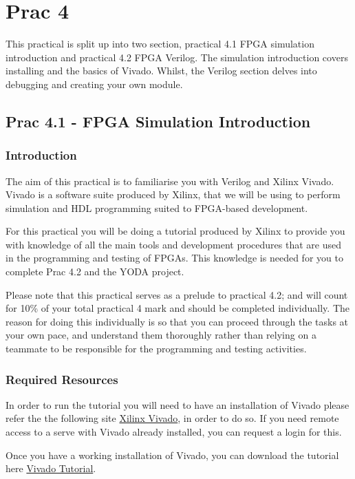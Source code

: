 
\section{Prac 4}
This practical is split up into two section, practical 4.1 FPGA simulation introduction and practical 4.2 FPGA Verilog. The simulation introduction covers installing and the basics of Vivado. Whilst, the Verilog section delves into debugging and creating your own module.
\label{sec:Prac4}

\subsection{Prac 4.1 - FPGA Simulation Introduction}
\subsubsection{Introduction}
The aim of this practical is to familiarise you with Verilog and Xilinx Vivado. Vivado is a software suite produced by Xilinx, that we will be using to perform simulation and HDL programming suited to FPGA-based development.

For this practical you will be doing a tutorial produced by Xilinx to provide you with knowledge of all the main tools and development procedures that are used in the programming and testing of FPGAs. This knowledge is needed for you to complete Prac 4.2 and the YODA project.

Please note that this practical serves as a prelude to practical 4.2; and will count for 10\% of your total practical 4 mark and should be completed individually. The reason for doing this individually is so that you can proceed through the tasks at your own pace, and understand them thoroughly rather than relying on a teammate to be responsible for the programming and testing activities.

\subsubsection{Required Resources}

In order to run the tutorial you will need to have an installation of Vivado please refer the the following site \href{http://wiki.ee.uct.ac.za/Xilinx_Vivado}{Xilinx Vivado}, in order to do so. If you need remote access to a serve with Vivado already installed, you can request a login for this.

Once you have a working installation of Vivado, you can download the tutorial here \href{https://www.xilinx.com/support/documentation/sw_manuals/xilinx2020_1/ug937-vivado-design-suite-simulation-tutorial.pdf}{Vivado Tutorial}.

